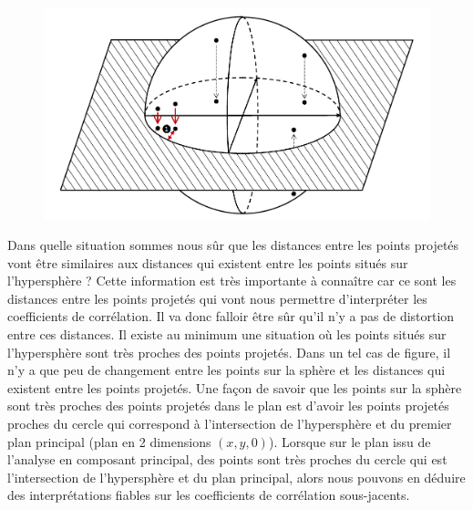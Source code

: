 \begin{figure}[H]\begin{center}\includegraphics[scale=0.35]{ilu/hyperProj.png}\end{center}\end{figure}

Dans quelle situation sommes nous sûr que les distances entre les points projetés vont être similaires aux distances qui existent entre les points situés sur l'hypersphère ? Cette information est très importante à connaître car ce sont les distances entre les points projetés qui vont nous permettre d'interpréter les coefficients de corrélation. Il va donc falloir être sûr qu'il n'y a pas de distortion entre ces distances.\newline
Il existe au minimum une situation où les points situés sur l'hypersphère sont très proches des points projetés. Dans un tel cas de figure, il n'y a que peu de changement entre les points sur la sphère et les distances qui existent entre les points projetés.\newline
Une façon de savoir que les points sur la sphère sont très proches des points projetés dans le plan est d'avoir les points projetés proches du cercle qui correspond à l'intersection de l'hypersphère et du premier plan principal (plan en 2 dimensions $(x,y,0)$). Lorsque sur le plan issu de l'analyse en composant principal, des points sont très proches du cercle qui est l'intersection de l'hypersphère et du plan principal, alors nous pouvons en déduire des interprétations fiables sur les coefficients de corrélation sous-jacents.\newline


